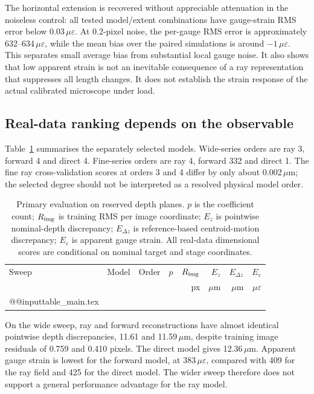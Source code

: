 \documentclass[10pt,a4paper]{article}
\begin{document}
The horizontal extension is recovered without appreciable attenuation in the noiseless control: all tested model/extent combinations have gauge-strain RMS error below 0.03\,$\mu\varepsilon$. At 0.2-pixel noise, the per-gauge RMS error is approximately 632--634\,$\mu\varepsilon$, while the mean bias over the paired simulations is around $-1\,\mu\varepsilon$. This separates small average bias from substantial local gauge noise. It also shows that low apparent strain is not an inevitable consequence of a ray representation that suppresses all length changes. It does not establish the strain response of the actual calibrated microscope under load.

\subsection{Real-data ranking depends on the observable}
Table~\ref{tab:main} summarises the separately selected models. Wide-series orders are ray 3, forward 4 and direct 4. Fine-series orders are ray 4, forward 332 and direct 1. The fine ray cross-validation scores at orders 3 and 4 differ by only about 0.002\,$\mu$m; the selected degree should not be interpreted as a resolved physical model order.

\begin{table}[tb]
\centering\small
\caption{Primary evaluation on reserved depth planes. $p$ is the coefficient count; $R_{\rm img}$ is training RMS per image coordinate; $E_z$ is pointwise nominal-depth discrepancy; $E_{\Delta z}$ is reference-based centroid-motion discrepancy; $E_\varepsilon$ is apparent gauge strain. All real-data dimensional scores are conditional on nominal target and stage coordinates.}
\label{tab:main}
\begin{tabular}{llrrrrrr}
\toprule
Sweep & Model & Order & $p$ & $R_{\rm img}$ & $E_z$ & $E_{\Delta z}$ & $E_\varepsilon$\\
 & & & & px & $\mu$m & $\mu$m & $\mu\varepsilon$\\
\midrule
\csname @@input\endcsname table_main.tex
\bottomrule
\end{tabular}
\end{table}

On the wide sweep, ray and forward reconstructions have almost identical pointwise depth discrepancies, 11.61 and 11.59\,$\mu$m, despite training image residuals of 0.759 and 0.410 pixels. The direct model gives 12.36\,$\mu$m. Apparent gauge strain is lowest for the forward model, at 383\,$\mu\varepsilon$, compared with 409 for the ray field and 425 for the direct model. The wider sweep therefore does not support a general performance advantage for the ray model.
\end{document}
